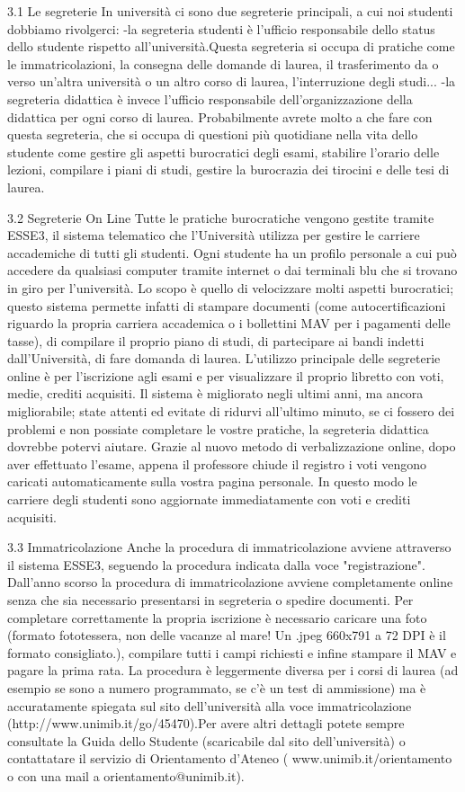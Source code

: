  3.1 Le segreterie
In università ci sono due segreterie principali, a cui noi studenti dobbiamo rivolgerci:
      -la segreteria studenti è l'ufficio responsabile dello status dello studente rispetto all'università.Questa segreteria si occupa di pratiche come le immatricolazioni, la consegna delle domande di laurea, il trasferimento da o verso un'altra università o un altro corso di laurea, l'interruzione degli studi...
      -la segreteria didattica è invece l'ufficio responsabile dell'organizzazione della didattica per ogni corso di laurea. Probabilmente avrete molto a che fare con questa segreteria, che si occupa di questioni più quotidiane nella vita dello studente come gestire gli aspetti burocratici degli esami, stabilire l'orario delle lezioni, compilare i piani di studi, gestire la burocrazia dei tirocini e delle tesi di laurea.

3.2 Segreterie On Line
Tutte le pratiche burocratiche vengono gestite tramite ESSE3, il sistema telematico che l'Università utilizza per gestire le carriere accademiche di tutti gli studenti. 
Ogni studente ha un profilo personale a cui può accedere da qualsiasi computer tramite internet o dai terminali blu che si trovano in giro per l'università. Lo scopo è quello di velocizzare molti aspetti burocratici; questo sistema permette infatti di stampare documenti (come autocertificazioni riguardo la propria carriera accademica o i bollettini MAV per i pagamenti delle tasse), di compilare il proprio piano di studi, di partecipare ai bandi indetti dall'Università, di fare domanda di laurea. L'utilizzo principale delle segreterie online è per l'iscrizione agli esami e per visualizzare il proprio libretto con voti, medie, crediti acquisiti. 
Il sistema è migliorato negli ultimi anni, ma ancora migliorabile; state attenti ed evitate di ridurvi all'ultimo minuto, se ci fossero dei problemi e non possiate completare le vostre pratiche, la segreteria didattica dovrebbe potervi aiutare.
Grazie al nuovo metodo di verbalizzazione online, dopo aver effettuato l'esame, appena il professore chiude il registro i voti vengono caricati automaticamente sulla vostra pagina personale. In questo modo le carriere degli studenti sono aggiornate immediatamente con voti e crediti acquisiti.

3.3 Immatricolazione
Anche la procedura di immatricolazione avviene attraverso il sistema ESSE3, seguendo la procedura indicata dalla voce "registrazione". Dall'anno scorso la procedura di immatricolazione avviene completamente online senza che sia necessario presentarsi in segreteria o spedire documenti. Per completare correttamente la propria iscrizione è necessario caricare una foto (formato fototessera, non delle vacanze al mare! Un .jpeg 660x791 a 72 DPI è il formato consigliato.), compilare tutti i campi richiesti e infine stampare il MAV e pagare la prima rata.
La procedura è leggermente diversa per i corsi di laurea (ad esempio se sono a numero programmato, se c'è un test di ammissione) ma è accuratamente spiegata sul sito dell'università alla voce immatricolazione (http://www.unimib.it/go/45470).Per avere altri dettagli potete sempre consultate la Guida dello Studente (scaricabile dal sito dell'università) o contattatare il servizio di Orientamento d'Ateneo ( www.unimib.it/orientamento o con una mail a orientamento@unimib.it).
